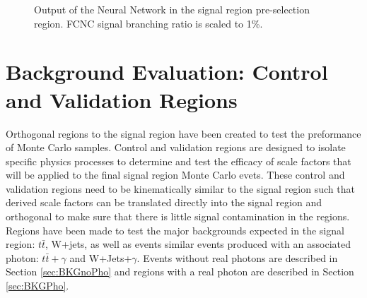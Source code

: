 \begin{figure}[h!]
\centering
{}\hfil
{}
\caption{Output of the Neural Network in the signal region pre-selection region.  FCNC signal branching ratio is scaled to 1\%.}
\label{fig:PreSelPlots5}
\end{figure}

\section{Background Evaluation: Control and Validation Regions}
\label{sec:BkgEvalCRVR}
Orthogonal regions to the signal region have been created to test the preformance of Monte Carlo samples.  Control and validation regions are designed to isolate specific physics processes to determine and test the efficacy of scale factors that will be applied to the final signal region Monte Carlo evets.  These control and validation regions need to be kinematically similar to the signal region such that derived scale factors can be translated directly into the signal region and orthogonal to make sure that there is little signal contamination in the regions.  Regions have been made to test the major backgrounds expected in the signal region: $t\bar{t}$, W+jets, as well as events similar events produced with an associated photon: $t\bar{t}+\gamma$ and W+Jets+$\gamma$.  Events without real photons are described in Section \ref{sec:BKGnoPho} and regions with a real photon are described in Section \ref{sec:BKGPho}.

